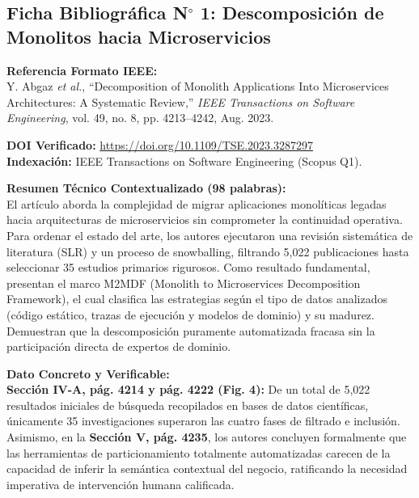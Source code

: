 \documentclass[11pt,a4paper]{article}
\begin{document}
\vspace{4mm}

\subsection*{Ficha Bibliográfica N$^\circ$ 1: Descomposición de Monolitos hacia Microservicios}

\noindent\textbf{Referencia Formato IEEE:}\\
\nocite{Abgaz2023}\cite{Abgaz2023} Y. Abgaz \textit{et al.}, ``Decomposition of Monolith Applications Into Microservices Architectures: A Systematic Review,'' \textit{IEEE Transactions on Software Engineering}, vol. 49, no. 8, pp. 4213--4242, Aug. 2023.

\vspace{1.5mm}
\noindent\textbf{DOI Verificado:} \url{https://doi.org/10.1109/TSE.2023.3287297}\\
\textbf{Indexación:} IEEE Transactions on Software Engineering (Scopus Q1).

\vspace{2mm}
\noindent\textbf{Resumen Técnico Contextualizado (98 palabras):}\\
El artículo aborda la complejidad de migrar aplicaciones monolíticas legadas hacia arquitecturas de microservicios sin comprometer la continuidad operativa. Para ordenar el estado del arte, los autores ejecutaron una revisión sistemática de literatura (SLR) y un proceso de snowballing, filtrando 5,022 publicaciones hasta seleccionar 35 estudios primarios rigurosos. Como resultado fundamental, presentan el marco M2MDF (Monolith to Microservices Decomposition Framework), el cual clasifica las estrategias según el tipo de datos analizados (código estático, trazas de ejecución y modelos de dominio) y su madurez. Demuestran que la descomposición puramente automatizada fracasa sin la participación directa de expertos de dominio.

\vspace{2mm}
\noindent\textbf{Dato Concreto y Verificable:}\\
\textbf{Sección IV-A, pág. 4214 y pág. 4222 (Fig. 4):} De un total de 5,022 resultados iniciales de búsqueda recopilados en bases de datos científicas, únicamente 35 investigaciones superaron las cuatro fases de filtrado e inclusión. Asimismo, en la \textbf{Sección V, pág. 4235}, los autores concluyen formalmente que las herramientas de particionamiento totalmente automatizadas carecen de la capacidad de inferir la semántica contextual del negocio, ratificando la necesidad imperativa de intervención humana calificada.
\end{document}
